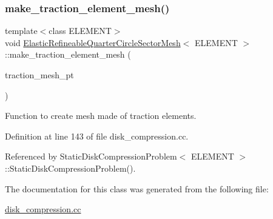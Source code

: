 \subsubsection{\texorpdfstring{make\+\_\+traction\+\_\+element\+\_\+mesh()}{make\_traction\_element\_mesh()}}
{\footnotesize\ttfamily template$<$class E\+L\+E\+M\+E\+NT$>$ \\
void \hyperlink{classElasticRefineableQuarterCircleSectorMesh}{Elastic\+Refineable\+Quarter\+Circle\+Sector\+Mesh}$<$ E\+L\+E\+M\+E\+NT $>$\+::make\+\_\+traction\+\_\+element\+\_\+mesh (\begin{DoxyParamCaption}\item[{Solid\+Mesh $\ast$\&}]{traction\+\_\+mesh\+\_\+pt }\end{DoxyParamCaption})\hspace{0.3cm}{\ttfamily [inline]}}



Function to create mesh made of traction elements. 



Definition at line 143 of file disk\+\_\+compression.\+cc.



Referenced by Static\+Disk\+Compression\+Problem$<$ E\+L\+E\+M\+E\+N\+T $>$\+::\+Static\+Disk\+Compression\+Problem().



The documentation for this class was generated from the following file\+:\begin{DoxyCompactItemize}
\item 
\hyperlink{disk__compression_8cc}{disk\+\_\+compression.\+cc}\end{DoxyCompactItemize}
